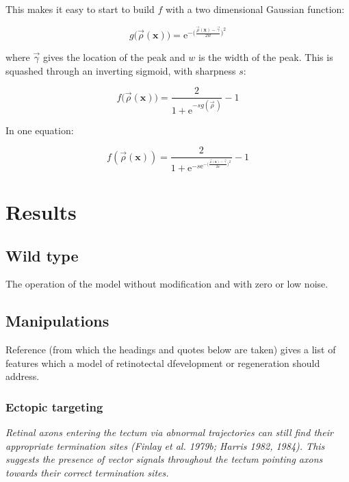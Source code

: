 \documentclass[11pt, a4paper]{article}
\newcommand{\mb}[1]{\mathbf{#1}} %
\begin{document}
This makes it easy to start to build $f$ with a two dimensional Gaussian
function:

\begin{equation}\label{eq:g}
g\big(\vec{\rho}(\mb{x})\big) = \mathrm{e}^{-\big(\frac{\vec{\rho}(\mb{x})-\vec{\gamma}}{2 w}\big)^2 }
\end{equation}

where $\vec{\gamma}$ gives the location of the peak and $w$ is the width
of the peak. This is squashed through an inverting sigmoid, with sharpness $s$:

\begin{equation}\label{eq:f}
f\big(\vec{\rho}(\mb{x})\big) = \frac{2}{1 + \mathrm{e}^{-s g(\vec{\rho}\,)}} - 1
\end{equation}

In one equation:

\begin{equation}\label{eq:gf}
f(\vec{\rho}(\mb{x})) = \frac{2}{1
+ \mathrm{e}^{-s \mathrm{e}^{-\big(\frac{\vec{\rho}(\mb{x})-\vec{\gamma}}{2 w}\big)^2 } }} - 1
\end{equation}

\section{Results}

\subsection{Wild type}

The operation of the model without modification and with zero or low noise.

\subsection{Manipulations}

Reference \cite{goodhill_development_2005} (from which the headings and quotes
below are taken) gives a list of features which a model of retinotectal
dfevelopment or regeneration should address.

\subsubsection{Ectopic targeting}

\begin{displayquote}
\emph{Retinal axons entering the tectum via abnormal trajectories can still find
their appropriate termination sites (Finlay et al. 1979b; Harris 1982,
1984). This suggests the presence of vector signals throughout the tectum
pointing axons towards their correct termination sites.}
\end{displayquote}
\end{document}
